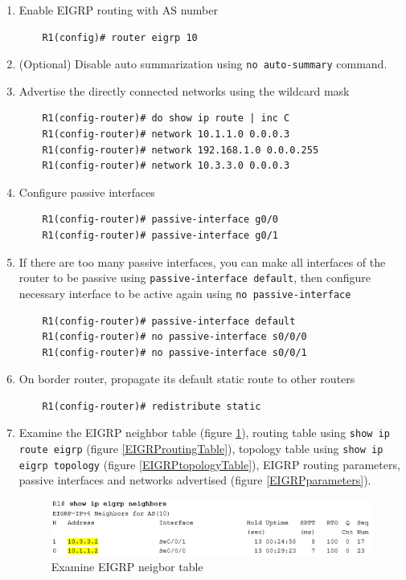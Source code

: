 \begin{enumerate}
\item Enable EIGRP routing with AS number
	\begin{verbatim}
	R1(config)# router eigrp 10
	\end{verbatim}
	
\item (Optional) Disable auto summarization using \verb|no auto-summary| command.
	
\item Advertise the directly connected networks using the wildcard mask
	\begin{verbatim}
	R1(config-router)# do show ip route | inc C
	R1(config-router)# network 10.1.1.0 0.0.0.3
	R1(config-router)# network 192.168.1.0 0.0.0.255 
	R1(config-router)# network 10.3.3.0 0.0.0.3
	\end{verbatim}
	
\item Configure passive interfaces 
	\begin{verbatim}
	R1(config-router)# passive-interface g0/0
	R1(config-router)# passive-interface g0/1
	\end{verbatim}
	
\item If there are too many passive interfaces, you can make all interfaces of the router to be passive using \verb|passive-interface default|, then configure necessary interface to be active again using \verb|no passive-interface|
	\begin{verbatim}
	R1(config-router)# passive-interface default
	R1(config-router)# no passive-interface s0/0/0
	R1(config-router)# no passive-interface s0/0/1
	\end{verbatim}
	
\item On border router, propagate its default static route to other routers
    \begin{verbatim}
    R1(config-router)# redistribute static
    \end{verbatim}

\item Examine the EIGRP neighbor table (figure \ref{neigborTable}), routing table using \verb|show ip route eigrp| (figure \ref{EIGRProutingTable}), topology table using \verb|show ip eigrp topology| (figure \ref{EIGRPtopologyTable}), EIGRP routing parameters, passive interfaces and networks advertised (figure \ref{EIGRPparameters}).
	\begin{figure}[hbtp]
	\caption{Examine EIGRP neigbor table}\label{neigborTable}
	\centering
	\includegraphics[scale=0.8]{pictures/neigborTable.PNG}
	\end{figure}
	

\end{enumerate}
